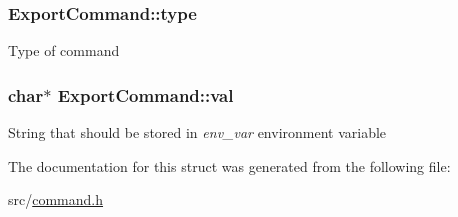 \subsubsection[{\texorpdfstring{type}{type}}]{ Export\+Command\+::type}\hypertarget{structExportCommand_a6089a285f9584b6f1c5430b46a9c0758}{}\label{structExportCommand_a6089a285f9584b6f1c5430b46a9c0758}
Type of command 
\subsubsection[{\texorpdfstring{val}{val}}]{\setlength{\rightskip}{0pt plus 5cm}char$\ast$ Export\+Command\+::val}\hypertarget{structExportCommand_a8e75db85606e5f9cfcc149c116c3be51}{}\label{structExportCommand_a8e75db85606e5f9cfcc149c116c3be51}
String that should be stored in {\itshape env\+\_\+var} environment variable 

The documentation for this struct was generated from the following file\+:\begin{DoxyCompactItemize}
\item 
src/\hyperlink{command_8h}{command.\+h}\end{DoxyCompactItemize}
